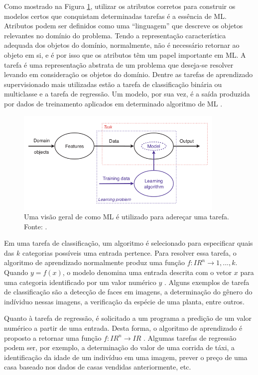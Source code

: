 Como mostrado na Figura \ref{fig:tasks}, utilizar os atributos corretos para construir os modelos certos que conquistam determinadas tarefas é a essência de ML. Atributos podem ser definidos como uma ``linguagem'' que descreve os objetos relevantes no domínio do problema. Tendo a representação característica adequada dos objetos do domínio, normalmente, não é necessário retornar ao objeto em si, e é por isso que os atributos têm um papel importante em ML. A tarefa é uma representação abstrata de um problema que deseja-se resolver levando em consideração os objetos do domínio. Dentre as tarefas de aprendizado supervisionado mais utilizadas estão a tarefa de classificação binária ou multiclasse e a tarefa de regressão. Um modelo, por sua vez, é a saída produzida por dados de treinamento aplicados em determinado algoritmo de ML \cite{flach}.

\begin{figure}
\centering
\includegraphics[height=5cm]{imgs/tasks}
\caption{Uma visão geral de como ML é utilizado para adereçar uma tarefa. Fonte: \cite{flach}.}
\label{fig:tasks}
\end{figure}


Em uma tarefa de classificação, um algoritmo é selecionado para especificar quais das $k$ categorias possíveis uma entrada pertence. Para resolver essa tarefa, o algoritmo de aprendizado normalmente produz uma função $f : I\!R^n \rightarrow {1,...,k}$. Quando $y = f(x)$, o modelo denomina uma entrada descrita com o vetor $x$ para uma categoria identificado por um valor numérico $y$ \cite{goodfellow}. Alguns exemplos de tarefa de classificação são a detecção de faces em imagens, a determinação do gênero do indíviduo nessas imagens, a verificação da espécie de uma planta, entre outros.

Quanto à tarefa de regressão, é solicitado a um programa a predição de um valor numérico a partir de uma entrada. Desta forma, o algoritmo de aprendizado é proposto a retornar uma função $f : I\!R^n \rightarrow I\!R$ \cite{goodfellow}. Algumas tarefas de regressão podem ser, por exemplo, a determinação do valor de uma corrida de táxi, a identificação da idade de um indivíduo em uma imagem, prever o preço de uma casa baseado nos dados de casas vendidas anteriormente, etc.

